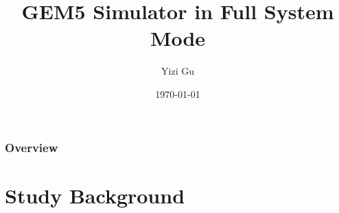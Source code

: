 \documentclass{beamer}
\title[Group Meeting Talk]{GEM5 Simulator in Full System Mode} %
\author{Yizi Gu} %
\institute[Department of EE,THU] %
{
Tsinghua University\\ %
\medskip
\textit{yizigu@gmail.com} %
}
\date{\today} %
\begin{document}
\begin{frame}
\titlepage %
\end{frame}

\begin{frame}
\frametitle{Overview} %
\tableofcontents %
\end{frame}


\section{Study Background} %
\end{document}
